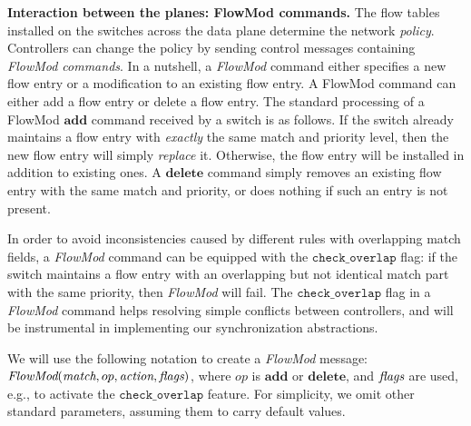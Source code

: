 \documentclass[conference]{sigcomm-alternate}
\newcommand{\add}{\textbf{add}\xspace}
\newcommand{\dele}{\textbf{delete}\xspace}
\newcommand{\FlowMod}{\emph{FlowMod}\xspace}
\newcommand{\match}{\emph{match}\xspace}
\newcommand{\action}{\emph{action}\xspace}
\newcommand{\flags}{\emph{flags}\xspace}
\newcommand{\checko}{\texttt{check\_overlap}\xspace}
\newcommand{\liron}[1]{\textit{\textcolor{mygreen}{[liron]: #1}}} %
\newcommand{\petr}[1]{\textit{\textcolor{blue}{[petr]: #1}}} %
\begin{document}
\vspace{1mm}
\noindent\textbf{Interaction between the planes: FlowMod commands.}
The flow tables installed on the switches across the data plane
determine the network \emph{policy}.
Controllers can change the policy by sending
control messages containing \emph{FlowMod commands}.
In a nutshell, a \emph{FlowMod} command either specifies a new flow entry or
a modification to an existing flow entry.
%
%
%
%
A FlowMod command can either add a flow entry or delete a flow entry.
The standard processing of a FlowMod $\add$ command received by a switch is
as follows.
If the switch already maintains a flow entry with \emph{exactly} the
same match and priority level, then the new flow entry will simply \emph{replace} it.
Otherwise, the flow entry will be installed in addition to existing
ones.
A $\dele$ command simply removes an existing flow entry with the same
match and priority,  or does nothing if such an entry is not present.



In order to avoid inconsistencies caused by different rules with
overlapping match fields, a \emph{FlowMod} command can be equipped with 
the $\checko$ flag:
if the switch maintains a flow entry with an overlapping but not
identical match part with the same priority, then
\emph{FlowMod} will fail.
The $\checko$ flag in a \emph{FlowMod} command helps resolving simple
conflicts between controllers, and will be instrumental
in implementing our synchronization abstractions.

We will use the following notation to create a \emph{FlowMod} message:
$\FlowMod(\match, op, \action, \flags)$, where
$op$ is $\add$ or $\dele$, and $\flags$ are used, e.g.,  to activate the $\checko$
feature.
For simplicity, we omit other standard parameters, assuming them to carry
default values.
\end{document}
